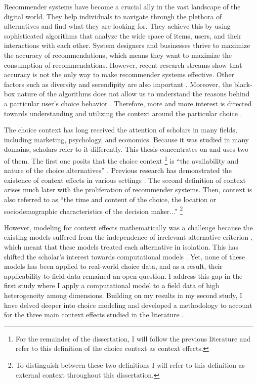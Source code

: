 \documentclass[a4paper,12pt]{article}
\begin{document}
Recommender systems have become a crucial ally in the vast landscape of the digital world. They help individuals to navigate through the plethora of alternatives and find what they are looking for. They achieve this by using sophisticated algorithms that analyze the wide space of items, users, and their interactions with each other. System designers and businesses thrive to maximize the accuracy of recommendations, which means they want to maximize the consumption of recommendations. However, recent research streams show that accuracy is not the only way to make recommender systems effective. Other factors such as diversity and serendipity are also important \citep{kaminskas2016diversity}. Moreover, the black-box nature of the algorithms does not allow us to understand the reasons behind a particular user's choice behavior \citep{kotkovSurveySerendipityRecommender2016, samih2021exmrec2vec}. Therefore, more and more interest is directed towards understanding and utilizing the context around the particular choice \citep{adomavicius2005toward}.

The choice context has long received the attention of scholars in many fields, including marketing, psychology, and economics. Because it was studied in many domains, scholars refer to it differently. This thesis concentrates on and uses two of them. The first one posits that the choice context \footnote{For the remainder of the dissertation, I will follow the previous literature \citep{truebloodEtAl13} and refer to this definition of the choice context as context effects.} is ``the availability and nature of the choice alternatives'' \citep{tversky1972elimination, huberEtAl82, simonson89}. Previous research has demonstrated the existence of context effects in various settings \citep{herne1997decoy, soltani2012range, evangelidisEtAl18,  wuConsguner20}. The second definition of context arises much later with the proliferation of recommender systems. Then, context is also referred to as ``the time and content of the choice, the location or sociodemographic characteristics of the decision maker...'' \citep{adomavicius2011context}\footnote{To distinguish between these two definitions I will refer to this definition as external context throughout this dissertation.}

However, modeling for context effects mathematically was a challenge because the existing models suffered from the independence of irrelevant alternative criterion \citep{luce59}, which meant that these models treated each alternative in isolation. This has shifted the scholar's interest towards computational models \citep{usher2001time, roe2001multialternative, trueblood2014multiattribute, noguchi2018multialternative}. Yet, none of these models has been applied to real-world choice data, and as a result, their applicability to field data remained an open question. I address this gap in the first study where I apply a computational model to a field data of high heterogeneity among dimensions. Building on my results in my second study, I have delved deeper into choice modeling and developed a methodology to account for the three main context effects studied in the literature \citep{truebloodEtAl13}. 
\end{document}
